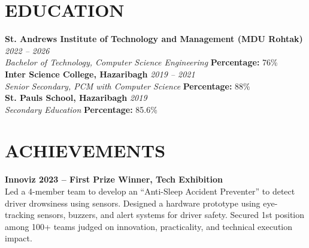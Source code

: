 \documentclass[a4paper,11pt]{article}
\begin{document}
\section*{EDUCATION}
\textbf{St. Andrews Institute of Technology and Management (MDU Rohtak)} \hfill \textit{2022 -- 2026} \\
\textit{Bachelor of Technology, Computer Science Engineering} \hfill \textbf{Percentage:} 76\% \\
\textbf{Inter Science College, Hazaribagh} \hfill \textit{2019 -- 2021} \\
\textit{Senior Secondary, PCM with Computer Science} \hfill \textbf{Percentage:} 88\% \\
\textbf{St. Pauls School, Hazaribagh} \hfill \textit{2019} \\
\textit{Secondary Education} \hfill \textbf{Percentage:} 85.6\%

\section*{ACHIEVEMENTS}
\textbf{Innoviz 2023 -- First Prize Winner, Tech Exhibition} \\
Led a 4-member team to develop an ``Anti-Sleep Accident Preventer'' to detect driver drowsiness using sensors. Designed a hardware prototype using eye-tracking sensors, buzzers, and alert systems for driver safety. Secured 1st position among 100+ teams judged on innovation, practicality, and technical execution impact.
\end{document}
